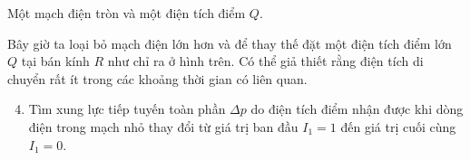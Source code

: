 \begin{vd}
\begin{center}
    \end{center}
    \begin{center}
        Một mạch điện tròn và một điện tích điểm $Q$.
    \end{center}
    Bây giờ ta loại bỏ mạch điện lớn hơn và để thay thế đặt một điện tích điểm lớn $Q$ tại bán kính $R$ như chỉ ra ở hình trên. Có thể giả thiết rằng điện tích di chuyển rất ít trong các khoảng thời gian có liên quan.
    \begin{enumerate}[1) ]
    \setcounter{enumi}{3}
    \item Tìm xung lực tiếp tuyến toàn phần $\Delta p$ do điện tích điểm nhận được khi dòng điện trong mạch nhỏ thay đổi từ giá trị ban đầu $I_1=1$ đến giá trị cuối cùng $I_1=0$.
\end{enumerate}
\end{vd}
